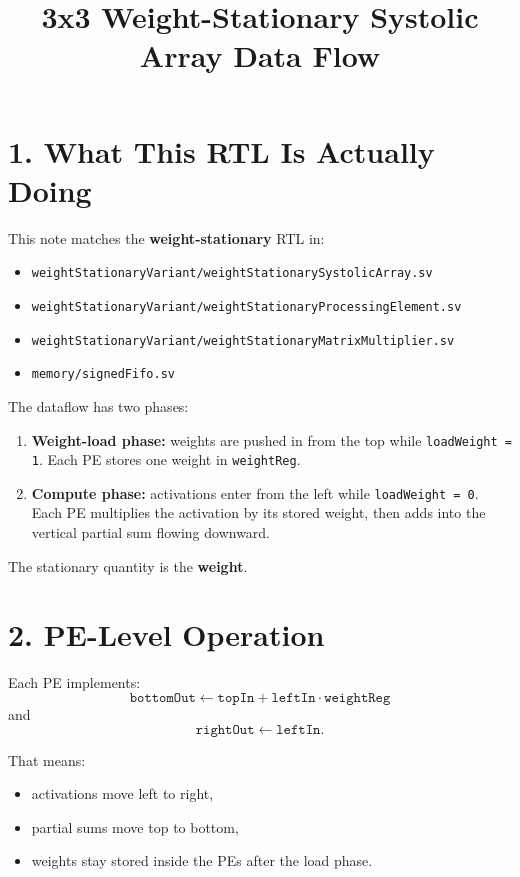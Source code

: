 \documentclass[11pt]{article}
\title{3x3 Weight-Stationary Systolic Array Data Flow}
\author{}
\date{}
\begin{document}
\maketitle

\section*{1. What This RTL Is Actually Doing}

This note matches the \textbf{weight-stationary} RTL in:
\begin{itemize}
    \item \texttt{weightStationaryVariant/weightStationarySystolicArray.sv}
    \item \texttt{weightStationaryVariant/weightStationaryProcessingElement.sv}
    \item \texttt{weightStationaryVariant/weightStationaryMatrixMultiplier.sv}
    \item \texttt{memory/signedFifo.sv}
\end{itemize}

The dataflow has two phases:
\begin{enumerate}
    \item \textbf{Weight-load phase:} weights are pushed in from the top while \texttt{loadWeight = 1}. Each PE stores one weight in \texttt{weightReg}.
    \item \textbf{Compute phase:} activations enter from the left while \texttt{loadWeight = 0}. Each PE multiplies the activation by its stored weight, then adds into the vertical partial sum flowing downward.
\end{enumerate}

The stationary quantity is the \textbf{weight}.

\section*{2. PE-Level Operation}

Each PE implements:
\[
\texttt{bottomOut} \leftarrow \texttt{topIn} + \texttt{leftIn} \cdot \texttt{weightReg}
\]
and
\[
\texttt{rightOut} \leftarrow \texttt{leftIn}.
\]

That means:
\begin{itemize}
    \item activations move left to right,
    \item partial sums move top to bottom,
    \item weights stay stored inside the PEs after the load phase.
\end{itemize}
\end{document}

